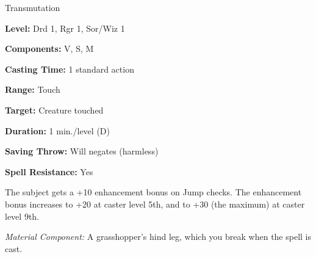 
Transmutation

\textbf{Level:} Drd 1, Rgr 1, Sor/Wiz 1

\textbf{Components:} V, S, M

\textbf{Casting Time:} 1 standard action

\textbf{Range:} Touch

\textbf{Target:} Creature touched

\textbf{Duration:} 1 min./level (D)

\textbf{Saving Throw:} Will negates (harmless)

\textbf{Spell Resistance:} Yes

The subject gets a +10 enhancement bonus on Jump checks. The enhancement bonus 
increases to +20 at caster level 5th, and to +30 (the maximum) at caster level 
9th.

\textit{Material Component:} A grasshopper's hind leg, which you break when the 
spell is cast.

